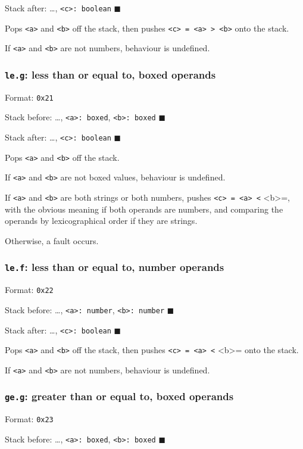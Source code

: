 Stack after: \ldots{}, \texttt{<c>: boolean} \(\blacksquare\)

Pops \texttt{<a>} and \texttt{<b>} off the stack, then pushes \texttt{<c> = <a> > <b>} onto
the stack.

If \texttt{<a>} and \texttt{<b>} are not numbers, behaviour is undefined.

\subsubsection{\texttt{le.g}: less than or equal to, boxed operands}
\label{sec:orgf9e2550}
Format: \texttt{0x21}

Stack before: \ldots{}, \texttt{<a>: boxed}, \texttt{<b>: boxed} \(\blacksquare\)

Stack after: \ldots{}, \texttt{<c>: boolean} \(\blacksquare\)

Pops \texttt{<a>} and \texttt{<b>} off the stack.

If \texttt{<a>} and \texttt{<b>} are not boxed values, behaviour is undefined.

If \texttt{<a>} and \texttt{<b>} are both strings or both numbers, pushes
\texttt{<c> = <a> <} <b>=, with the obvious meaning if both operands are
numbers, and comparing the operands by lexicographical order if they are
strings.

Otherwise, a fault occurs.

\subsubsection{\texttt{le.f}: less than or equal to, number operands}
\label{sec:orgef83a7a}
Format: \texttt{0x22}

Stack before: \ldots{}, \texttt{<a>: number}, \texttt{<b>: number} \(\blacksquare\)

Stack after: \ldots{}, \texttt{<c>: boolean} \(\blacksquare\)

Pops \texttt{<a>} and \texttt{<b>} off the stack, then pushes \texttt{<c> = <a> <} <b>= onto
the stack.

If \texttt{<a>} and \texttt{<b>} are not numbers, behaviour is undefined.

\subsubsection{\texttt{ge.g}: greater than or equal to, boxed operands}
\label{sec:org7e275af}
Format: \texttt{0x23}

Stack before: \ldots{}, \texttt{<a>: boxed}, \texttt{<b>: boxed} \(\blacksquare\)

